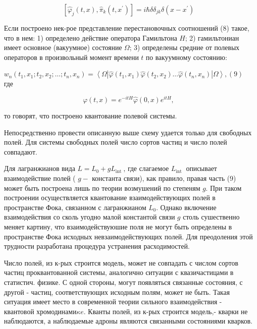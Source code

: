 \documentclass[10pt]{article}
\begin{document}
\[

\left[\hat{\varphi}_{j}(t, x), \hat{\pi}_{k}\left(t, x^{\prime}\right)\right]=i \hbar \delta \delta_{j k} \delta\left(x-x^{\prime}\right)

\]



Если построено нек-рое представление перестановочных соотношений (8) такое, что в нем: 1) определено действие оператора Гамильтона $H$; 2) гамильтониан имеет основное (вакуумное) состояние $\Omega$; 3) определены средние от полевых операторов в произвольный момент времени $t$ по вакуумному состоянию:



$w_{n}\left(t_{1}, x_{1} ; t_{2}, x_{2} ; \ldots ; t_{n}, x_{n}\right)=\left\langle\Omega\left|\hat{\varphi}\left(t_{1}, x_{1}\right) \hat{\varphi}\left(t_{2}, x_{2}\right) \ldots \hat{\varphi}\left(t_{n}, x_{n}\right)\right| \Omega\right\rangle,(9)$ где



\[

\hat{\varphi}(t, x)=e^{-i t H} \hat{\varphi}(0, x) e^{i t H},

\]



то говорят, что построено квантование полевой системы.



Непосредственно провести описанную выше схему удается только для свободных полей. Для системы свободных полей число сортов частиц и число полей совпадают.



Для лагранжианов вида $L=L_{0}+g L_{\text {int }}$, где слагаемое $L_{\text {int }}$ описывает взаимодействие полей ( $g-$ константа связи), как правило, правая часть (9) может быть построена лишь по теории возмушений по степеням $g$. При таком построении осуществляется квантование взаимодействующих полей в пространстве Фока, связанном с лагранжианом $L_{0}$. Однако включение взаимодействия со сколь угодно малой константой связи $g$ столь сушественно меняет картину, что взаимодействуюшие поля не могут быть определены в пространстве Фока исходных невзаимодействующих полей. Для преодоления этой трудности разработана процедура устранения расходимостей.



Число полей, из к-рых строится модель, может не совпадать с числом сортов частиц проквантованной системы, аналогично ситуации с квазичастицами в статистич. физике. С одной стороны, могут появляться связанные состояния, с другой - частиц, соответствующих исходным полям, может не быть. Такая ситуация имеет место в современной теории сильного взаимодействия - квантовой хромодинами$\kappa e$. Кванты полей, из к-рых строится модель,- кварки не наблюдаются, а наблюдаемые адроны являются связанными состояниями кварков.
\end{document}
